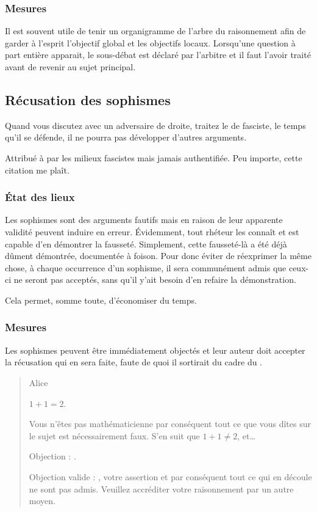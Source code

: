 \subsubsection{Mesures}
Il est souvent utile de tenir un organigramme de l’arbre du raisonnement afin de garder à l’esprit l’objectif global et les objectifs locaux. Lorsqu’une question à part entière apparait, le sous-débat est déclaré par l’arbitre et il faut l’avoir traité avant de revenir au sujet principal.

\subsection{Récusation des sophismes}
\epigraph{Quand vous discutez avec un adversaire de droite, traitez le de fasciste, le temps qu’il se défende, il ne pourra pas développer d’autres arguments.}{Attribué à  par les milieux fascistes mais jamais authentifiée. Peu importe, cette citation me plaît.}
\subsubsection{État des lieux}
Les sophismes sont des arguments fautifs mais en raison de leur apparente validité peuvent induire en erreur. Évidemment, tout rhéteur les connaît et est capable d’en démontrer la fausseté. Simplement, cette fausseté-là a été déjà dûment démontrée, documentée à foison. Pour donc éviter de réexprimer la même chose, à chaque occurrence d’un sophisme, il sera communément admis que ceux-ci ne seront pas acceptés, sans qu’il y’ait besoin d’en refaire la démonstration.

Cela permet, somme toute, d’économiser du temps.

\subsubsection{Mesures}
Les sophismes peuvent être immédiatement objectés et leur auteur doit accepter la récusation qui en sera faite, faute de quoi il sortirait du cadre du \mainabbr{}.
\begin{quote}
  \begin{drama}{0cm}{0cm}{Alice}

    \Aspeaks       $1+1=2$.

    \Bspeaks       Vous n’êtes pas mathématicienne par conséquent tout ce que vous dîtes sur le sujet est nécessairement faux. S’en suit que $1+1\neq2$, et…

    \Aspeaks       Objection : .

    \Arbitrespeaks Objection valide : \B, votre assertion et par conséquent tout ce qui en découle ne sont pas admis. Veuillez accréditer votre raisonnement par un autre moyen.

  \end{drama}
\end{quote}

